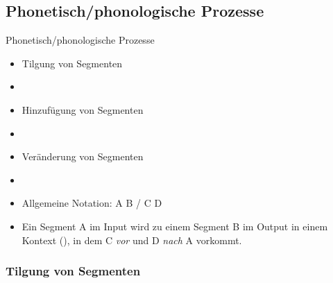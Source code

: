 %
\subsection{Phonetisch/phonologische Prozesse}
%

\begin{frame}{Phonetisch/phonologische Prozesse}

\begin{itemize}
	\item Tilgung von Segmenten
	\item[]
	\item Hinzufügung von Segmenten
	\item[]
	\item Veränderung von Segmenten
	\item[]
	\item Allgemeine Notation: A \ras B / C \underline{\quad} D
	\item[] Ein Segment A im Input wird zu einem Segment B im Output in einem Kontext (\gqq{/}), in dem C \textit{vor} und D \textit{nach} A vorkommt. 
\end{itemize}

\end{frame}



%
\subsubsection{Tilgung von Segmenten}
%

